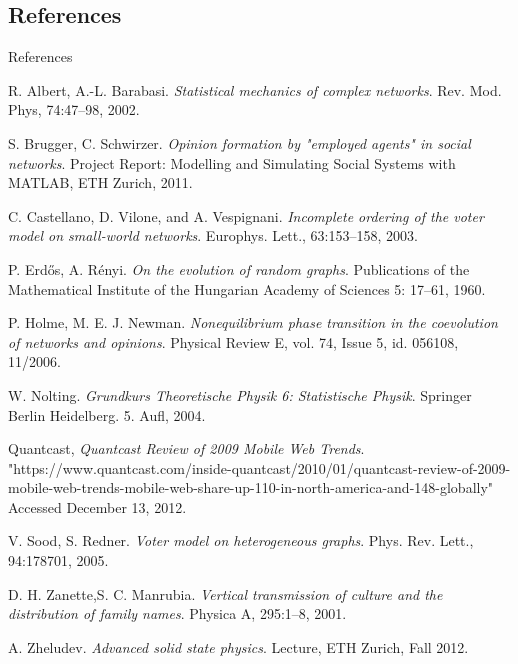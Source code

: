 \documentclass[xcolor=x11names,compress]{beamer}
\renewcommand{\(}{\begin{columns}}
\renewcommand{\)}{\end{columns}}
\newcommand{\<}[1]{\begin{column}{#1}}
\renewcommand{\>}{\end{column}}
\begin{document}
\subsection{References}
\begin{frame}{References}

\begin{tiny}


\begin{thebibliography}{9}

R. Albert, A.-L. Barabasi. \emph{Statistical mechanics of complex
networks}. Rev. Mod. Phys, 74:47–98, 2002.

S. Brugger, C. Schwirzer. \emph{Opinion formation by "employed agents"
in social networks}. Project Report: Modelling and Simulating Social Systems with MATLAB, ETH Zurich, 2011.

C. Castellano, D. Vilone, and A. Vespignani. \emph{Incomplete ordering
of the voter model on small-world networks}. Europhys.
Lett., 63:153–158, 2003.

P. Erd\H{o}s, A. R\'{e}nyi. \emph{On the evolution of random graphs}. Publications of the Mathematical Institute of the Hungarian Academy of Sciences 5: 17–61, 1960.

P. Holme, M. E. J. Newman. \emph{Nonequilibrium phase transition in the coevolution of networks and opinions}. Physical Review E, vol. 74, Issue 5, id. 056108, 11/2006.

W. Nolting. \emph{Grundkurs Theoretische Physik 6: Statistische Physik}. Springer Berlin Heidelberg. 5. Aufl, 2004.

Quantcast, \emph{Quantcast Review of 2009 Mobile Web Trends}. "https://www.quantcast.com/inside-quantcast/2010/01/quantcast-review-of-2009-mobile-web-trends-mobile-web-share-up-110-in-north-america-and-148-globally" Accessed December 13, 2012.

V. Sood, S. Redner. \emph{Voter model on heterogeneous graphs}. Phys. Rev. Lett., 94:178701, 2005.

D. H. Zanette,S. C. Manrubia. \emph{Vertical transmission of culture and the distribution of family names}. Physica A, 295:1–8, 2001.

A. Zheludev. \emph{Advanced solid state physics}. Lecture, ETH Zurich, Fall 2012.

\end{thebibliography}

\end{tiny}

\end{frame}
\end{document}
